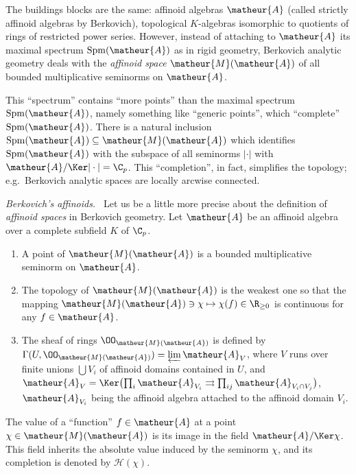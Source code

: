 \begin{para}
 The buildings blocks are the same: affinoid algebras $\matheur{A}$
 (called strictly affinoid algebras by Berkovich), \ie topological
 $K$-algebras isomorphic to quotients of rings of restricted power
 series. 
 However, instead of attaching to $\matheur{A}$ its maximal spectrum
 $\mathrm{Spm}(\matheur{A})$ as in rigid geometry, 
 Berkovich analytic geometry deals with the {\it affinoid space}
 $\matheur{M}(\matheur{A})$ of all bounded multiplicative seminorms
 on $\matheur{A}$.

 This ``spectrum'' contains ``more points'' than the maximal spectrum
 $\mathrm{Spm}(\matheur{A})$, namely something 
 like ``generic points'', which ``complete'' $\mathrm{Spm}(\matheur{A})$.
 There is a natural inclusion $\mathrm{Spm}(\matheur{A})\subseteq 
 \matheur{M}(\matheur{A})$ which identifies $\mathrm{Spm}(\matheur{A})$
 with the subspace of all seminorms $|\cdot|$ with
 $\matheur{A}/\Ker |\cdot| =\C_p$.
 This ``completion'', in fact, simplifies the topology; e.g.\ Berkovich
 analytic spaces are locally arcwise connected. 
\end{para}

\begin{para}
 {\itshape Berkovich's affinoids.\ }
 Let us be a little more precise about the definition of 
 {\it affinoid spaces} in Berkovich geometry.
 Let $\matheur{A}$ be an affinoid algebra over a complete subfield $K$ of 
 $\C_p$.

 \begin{enumerate}
  \item A point of $\matheur{M}(\matheur{A})$ is a bounded multiplicative
	seminorm on $\matheur{A}$.
  \item The topology of $\matheur{M}(\matheur{A})$ is the weakest one so
	that the mapping
	$\matheur{M}(\matheur{A})\ni\chi\mapsto\chi(f)\in \R_{\ge 0}$
	is continuous for any $f\in\matheur{A}$.
  \item The sheaf of rings $\OO_{\matheur{M}(\matheur{A})}$ is defined by 
	$\Gamma(U,\OO_{\matheur{M}(\matheur{A})})=\varprojlim\matheur{A}_V$, 
	where $V$ runs over finite unions $\bigcup V_i$ of affinoid
	domains contained in $U$, and
	$\matheur{A}_V= \Ker\bigl(\prod_i\matheur{A}_{V_i}
	\rightrightarrows
	\prod_{ij}\matheur{A}_{V_i\cap V_j}\bigr)$, $\matheur{A}_{V_i}$
	being the affinoid algebra attached to the affinoid domain $V_i$.
 \end{enumerate}

 The value of a ``function'' $f\in \matheur{A}$ at a point $\chi\in 
 \matheur{M}(\matheur{A})$ is its image in the field
 $\matheur{A}/\Ker\chi$. This field inherits the absolute value induced by 
 the seminorm $\chi$, and its completion is
 denoted by $\mathscr{H}(\chi)$.
\end{para}

